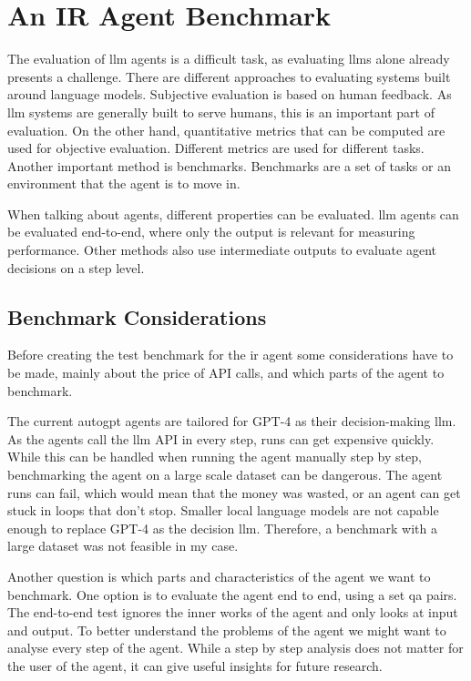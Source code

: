 \documentclass[../main.tex]{subfiles}
\begin{document}
\chapter{An IR Agent Benchmark}
\label{ch:benchmarks}

The evaluation of \gls{llm} agents is a difficult task,
as evaluating \glspl{llm} alone already presents a challenge. %
There are different approaches to evaluating systems built around language models.
Subjective evaluation is based on human feedback.
As \gls{llm} systems are generally built to serve humans, this is an important part of evaluation.
On the other hand,
quantitative metrics that can be computed are used for objective evaluation.
Different metrics are used for different tasks. Another important method is benchmarks.
Benchmarks are a set of tasks or an environment that the agent is to move in.

When talking about agents, different properties can be evaluated.
\gls{llm} agents can be evaluated end-to-end, where only the output is
relevant for measuring performance.
Other methods also use intermediate outputs to evaluate agent decisions on a step level.

\section{Benchmark Considerations}

Before creating the test benchmark for the \gls{ir} agent some considerations
have to be made, mainly about the price of API calls, and which parts of the agent
to benchmark.

The current \gls{autogpt} agents are tailored for GPT-4 as their decision-making
\gls{llm}.
As the agents call the \gls{llm} API in every step,
runs can get expensive quickly.
While this can be handled when running the agent manually step by step,
benchmarking the agent on a large scale dataset can be dangerous.
The agent runs can fail, which would mean that the money was wasted,
or an agent can get stuck in loops that don't stop.
Smaller local language models are not capable enough to replace GPT-4
as the decision \gls{llm}.
Therefore, a benchmark with a large dataset was not feasible in my case.

Another question is which parts and characteristics of the agent we want to benchmark.
One option is to evaluate the agent end to end, using a set \gls{qa} pairs.
The end-to-end test ignores the inner works of the agent and only looks at
input and output.
To better understand the problems of the agent we might want to analyse every
step of the agent.
While a step by step analysis does not matter for the user of the agent,
it can give useful insights for future research.
\end{document}
